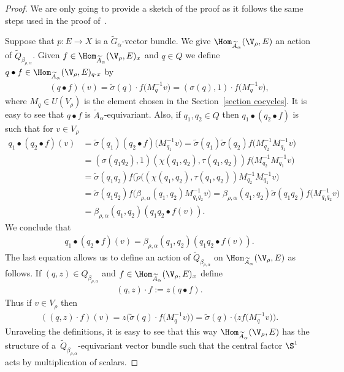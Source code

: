 \begin{proof} We are only going to provide a sketch of the proof as it follows the same
steps used in the proof of~\cite[Theorem 2.1]{GomezUribe}.

Suppose that $p\colon E \rightarrow X$ is a $\widetilde{G}_{\alpha}$-vector bundle. We give
$\Hom_{\widetilde{A}_{\alpha}}(\V_{\rho},E)$ an action of
	$\widetilde{Q}_{\beta_{\rho,\alpha}}$. Given $f \in
\Hom_{\widetilde{A}_{\alpha}}(\V_{\rho},E)_{x}$ and
$q\in Q$ we define $q \bullet f \in
\Hom_{\widetilde{A}_{\alpha}}(\V_{\rho},E)_{q\cdot x}$ by
\begin{gather*}
(q\bullet f)(v)=\tilde{\sigma}(q)\cdot f\big(M_{q}^{-1}v\big)
=(\sigma(q),1) \cdot f\big(M_{q}^{-1}v\big),
\end{gather*}
where $M_{q} \in U(V_{\rho})$ is the element chosen in the Section~\ref{section cocycles}.
It is easy to see that $q \bullet f$ is $\widetilde{A}_{\alpha}$-equivariant. Also,
if $q_{1}, q_{2}\in Q$ then $q_{1}\bullet
(q_{2} \bullet f)$ is such that for $v \in V_{\rho}$
\begin{align*}
q_{1}\bullet(q_{2}\bullet f)(v)&=\tilde{\sigma}(q_{1})
(q_{2}\bullet f)\big(M_{q_{1}}^{-1}v\big)=\tilde{\sigma}(q_{1})\tilde{\sigma}(q_{2})
f\big(M_{q_{2}}^{-1}M_{q_{1}}^{-1}v\big)\\
&=(\sigma(q_{1}q_{2}),1)(\chi(q_{1},q_{2}),\tau(q_{1},q_{2}))
f\big(M_{q_{2}}^{-1}M_{q_{1}}^{-1}v\big)\\
&=\tilde{\sigma}(q_{1}q_{2})f(\tilde{\rho}\big((\chi(q_{1},q_{2}),\tau(q_{1},q_{2}))
M_{q_{2}}^{-1}M_{q_{1}}^{-1}v\big)
\\
&=\tilde{\sigma}(q_{1}q_{2})
f\big(\beta_{\rho,\alpha}(q_{1},q_{2})M_{q_{1}q_{2}}^{-1}v\big)=\beta_{\rho,\alpha}(q_{1},q_{2}) \tilde{\sigma}(q_{1}q_{2})
f\big(M_{q_{1}q_{2}}^{-1}v\big)\\
&=\beta_{\rho,\alpha}(q_{1},q_{2})(q_{1}q_{2}\bullet f(v)).
\end{align*}
We conclude that
\begin{gather*}
q_{1}\bullet(q_{2}\bullet
f)(v)=\beta_{\rho,\alpha}(q_{1},q_{2})(q_{1}q_{2}\bullet f(v)).
\end{gather*}
The last equation allows us to define an action of
$\widetilde{Q}_{\beta_{\rho,\alpha}}$ on
$\Hom_{\widetilde{A}_{\alpha}}(\V_{\rho},E)$ as follows. If
$(q, z) \in Q_{\beta_{\rho,\alpha}}$ and $f \in
\Hom_{\widetilde{A}_{\alpha}}(\V_{\rho},E)_{x}$ define
\begin{gather*}
(q,z)\cdot f:=z(q\bullet f).
\end{gather*}
Thus if $v\in V_{\rho}$ then
\begin{gather*}
((q,z)\cdot f)(v)=z\big(\tilde{\sigma}(q)\cdot f\big(M_{q}^{-1}v\big)\big)=
\tilde{\sigma}(q)\cdot \big(zf\big(M_{q}^{-1}v\big)\big).
\end{gather*}
Unraveling the definitions, it is easy to see that this way
$\Hom_{\widetilde{A}_{\alpha}}(\V_{\rho},E)$ has the structure of
a~$\widetilde{Q}_{\beta_{\rho,\alpha}}$-equivariant vector bundle such that
the central factor $\S^{1}$ acts by multiplication of scalars.


\end{proof}
